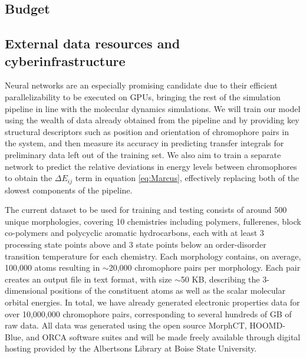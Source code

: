 \documentclass[12pt]{article}
\begin{document}
\subsection{Budget}

\subsection{External data resources and cyberinfrastructure}


Neural networks are an especially promising candidate due to their efficient parallelizability to be executed on GPUs, bringing the rest of the simulation pipeline in line with the molecular dynamics simulations\cite{Oh2004}.
We will train our model using the wealth of data already obtained from the pipeline and by providing key structural descriptors such as position and orientation of chromophore pairs in the system, and then measure its accuracy in predicting transfer integrals for preliminary data left out of the training set.
We also aim to train a separate network to predict the relative deviations in energy levels between chromophores to obtain the $\Delta E_{ij}$ term in equation \ref{eq:Marcus}, effectively replacing both of the slowest components of the pipeline.

The current dataset to be used for training and testing consists of around 500 unique morphologies, covering 10 chemistries including polymers, fullerenes, block co-polymers and polycyclic aromatic hydrocarbons, each with at least 3 processing state points above and 3 state points below an order-disorder transition temperature for each chemistry.
Each morphology contains, on average, 100,000 atoms resulting in $\sim$20,000 chromophore pairs per morphology.
Each pair creates an output file in text format, with size $\sim$50 KB, describing the 3-dimensional positions of the constituent atoms as well as the scalar molecular orbital energies.
In total, we have already generated electronic properties data for over 10,000,000 chromophore pairs, corresponding to several hundreds of GB of raw data.
All data was generated using the open source MorphCT\cite{MorphCT,Jones2017}, HOOMD-Blue\cite{Anderson08}, and ORCA\cite{Neese2012b} software suites and will be made freely available through digital hosting provided by the Albertsons Library at Boise State University.

\newpage




\end{document}
